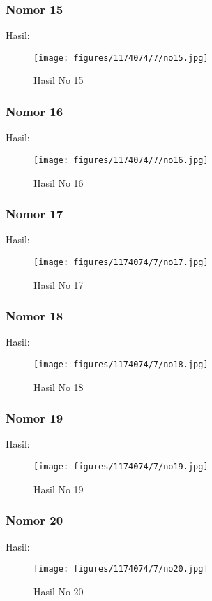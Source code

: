 \subsubsection{Nomor 15}
\hfill\break

Hasil:
\begin{figure}[H]
\centering
	\texttt{[image: figures/1174074/7/no15.jpg]}
	\caption{Hasil No 15}
\end{figure}

\subsubsection{Nomor 16}
\hfill\break

Hasil:
\begin{figure}[H]
\centering
	\texttt{[image: figures/1174074/7/no16.jpg]}
	\caption{Hasil No 16}
\end{figure}

\subsubsection{Nomor 17}
\hfill\break

Hasil:
\begin{figure}[H]
\centering
	\texttt{[image: figures/1174074/7/no17.jpg]}
	\caption{Hasil No 17}
\end{figure}

\subsubsection{Nomor 18}
\hfill\break

Hasil:
\begin{figure}[H]
\centering
	\texttt{[image: figures/1174074/7/no18.jpg]}
	\caption{Hasil No 18}
\end{figure}

\subsubsection{Nomor 19}
\hfill\break

Hasil:
\begin{figure}[H]
\centering
	\texttt{[image: figures/1174074/7/no19.jpg]}
	\caption{Hasil No 19}
\end{figure}

\subsubsection{Nomor 20}
\hfill\break

Hasil:
\begin{figure}[H]
\centering
	\texttt{[image: figures/1174074/7/no20.jpg]}
	\caption{Hasil No 20}
\end{figure}
